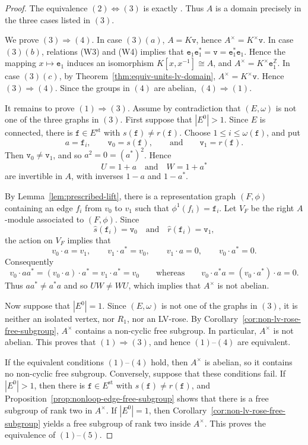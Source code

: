 \documentclass{article}
\theoremstyle{definition}
\begin{document}
\begin{proof}
The equivalence $(2)\Leftrightarrow(3)$ is exactly \cite[Theorem~41]{HaP}.
Thus $A$ is a domain precisely in the three cases listed in $(3)$.

We prove $(3)\Rightarrow(4)$. In case $(3)(a)$, $A=K\mathtt{v}$, hence
$A^\times=K^\times\mathtt{v}$. In case $(3)(b)$, relations (W3) and (W4) implies that $\mathtt{e}_1\mathtt{e}_1^*=\mathtt{v}=\mathtt{e}_1^*\mathtt{e}_1$.
Hence the mapping $x\mapsto \mathtt{e}_1$ induces an isomorphism
$K[x,x^{-1}]\cong A$, and $A^\times=K^\times\mathtt{e}_1^{\mathbb Z}$.
In case $(3)(c)$, by Theorem~\ref{thm:equiv-units-lv-domain},
$A^\times=K^\times\mathtt{v}$. Hence $(3)\Rightarrow(4)$. Since the
groups in $(4)$ are abelian, $(4)\Rightarrow(1)$.

It remains to prove $(1)\Rightarrow(3)$. 
Assume by contradiction that $(E,\omega)$ is not one of the three graphs in $(3)$.
First suppose that $|E^0|>1$. Since $E$ is connected, there is
$\mathtt{f}\in E^{\mathrm{st}}$ with
$s(\mathtt{f})\neq r(\mathtt{f})$. Choose
$1\leq i\leq\omega(\mathtt{f})$, and put
$$
a=\mathtt{f}_i,\qquad
\mathtt{v}_0=s(\mathtt{f}),\qquad\text{and}\qquad
\mathtt{v}_1=r(\mathtt{f}).
$$
Then $\mathtt{v}_0\neq\mathtt{v}_1$, and so $a^2=0=(a^*)^2$. Hence
$$
U=1+a\quad\text{and}\quad W=1+a^*
$$
are invertible in $A$, with inverses $1-a$ and $1-a^*$.

By Lemma~\ref{lem:prescribed-lift}, there is a representation graph
$(F,\phi)$ containing an edge $f_i$ from $v_0$ to $v_1$ such that
$\phi^1(f_i)=\mathtt{f}_i$. Let $V_F$ be the right
$A$-module associated to $(F,\phi)$. Since
$$
\widehat s(\mathtt{f}_i)=\mathtt{v}_0\quad\text{and}\quad
\widehat r(\mathtt{f}_i)=\mathtt{v}_1,
$$
the action on $V_F$ implies that
$$
v_0\cdot a=v_1,\qquad v_1\cdot a^*=v_0,\qquad
v_1\cdot a=0,\qquad v_0\cdot a^*=0.
$$
Consequently
$$
v_0\cdot aa^*=(v_0\cdot a)\cdot a^*=v_1\cdot a^*=v_0 \qquad \text{whereas} \qquad v_0\cdot a^*a=(v_0\cdot a^*)\cdot a=0.
$$
Thus $aa^*\neq a^*a$ and so $UW\neq WU$, which implies that $A^\times$ is not abelian.

Now suppose that $|E^0|=1$. Since $(E,\omega)$ is not one of the graphs in $(3)$, it is neither an isolated vertex, nor $R_1$, nor an LV-rose. By Corollary~\ref{cor:non-lv-rose-free-subgroup}, $A^\times$ contains a non-cyclic free subgroup. In particular, $A^\times$ is not abelian. This
proves that $(1)\Rightarrow(3)$, and hence $(1)$--$(4)$ are equivalent.

If the equivalent conditions
$(1)$--$(4)$ hold, then $A^\times$ is abelian, so it contains no
non-cyclic free subgroup. Conversely, suppose that these conditions fail.
If $|E^0|>1$, then there is $\mathtt{f}\in E^{\mathrm{st}}$ with
$s(\mathtt{f})\neq r(\mathtt{f})$, and
Proposition~\ref{prop:nonloop-edge-free-subgroup} shows that there is a free subgroup of rank two
in $A^\times$. If $|E^0|=1$, then
Corollary~\ref{cor:non-lv-rose-free-subgroup} yields a free subgroup of rank two inside $A^\times$. This proves the equivalence of $(1)$--$(5)$.
\end{proof}
\end{document}
